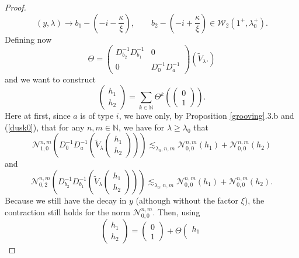 \documentclass[11 pt]{amsart}
\theoremstyle{definition}
\theoremstyle{remark}
\numberwithin{equation}{section}
\begin{document}
\begin{proof}
  \[ (y, \lambda) \rightarrow b_1 - \left( - i - \frac{\kappa}{\xi} \right), \qquad
     b_2 - \left( - i + \frac{\kappa}{\xi} \right) \in \mathcal{W}_{2} (1^+, \lambda_0^+) . \]
  Defining now
  \[ \Theta = \left(\begin{array}{cc}
       D_{b_2}^{- 1} D_{b_1}^{- 1} & 0\\
       0 & D_0^{- 1} D_a^{- 1}
     \end{array}\right) (\widetilde{V}_{\lambda} .) \]
  and we want to construct
  \[ \left(\begin{array}{c}
       h_1\\
       h_2
     \end{array}\right) = \sum_{k \in \mathbb{N}} \Theta^k \left(
     \left(\begin{array}{c}
       0\\
       1
     \end{array}\right) \right). \]
Here at first, since $a$ is of type $i$, we have only, by Proposition \ref{grooving}.3.b and (\ref{dusk0}), that for any $n, m \in \mathbb{N}$, we have for $\lambda \geqslant
  \lambda_0$ that
  \[ \mathcal{N}_{1, 0}^{n, m} \left( D_0^{- 1} D_a^{- 1} \left(
     \widetilde{V}_{\lambda} \left(\begin{array}{c}
       h_1\\
       h_2
     \end{array}\right) \right) \right) \lesssim_{\lambda_0, n, m}
     \mathcal{N}_{0, 0}^{n, m} (h_1) +\mathcal{N}_{0, 0}^{n, m} (h_2) \]
  and
  \[ \mathcal{N}_{0, 2}^{n, m} \left( D_{b_2}^{- 1} D_{b_1}^{- 1} \left(
     \widetilde{V}_{\lambda} \left(\begin{array}{c}
       h_1\\
       h_2
     \end{array}\right) \right) \right) \lesssim_{\lambda_0, n, m}
     \mathcal{N}_{0, 0}^{n, m} (h_1) +\mathcal{N}_{0, 0}^{n, m} (h_2) . \]
Because we still have the decay in $y$ (although without the factor $\xi$), the contraction still holds for the norm $\mathcal{N}_{0, 0}^{n, m}$. Then, using
 \[ \left(\begin{array}{c}
       h_1\\
       h_2
     \end{array}\right) = \left(\begin{array}{c}
       0\\
       1
     \end{array}\right) + \Theta \left(\begin{array}{c}
       h_1\\

\end{array}\]
\end{proof}
\end{document}
